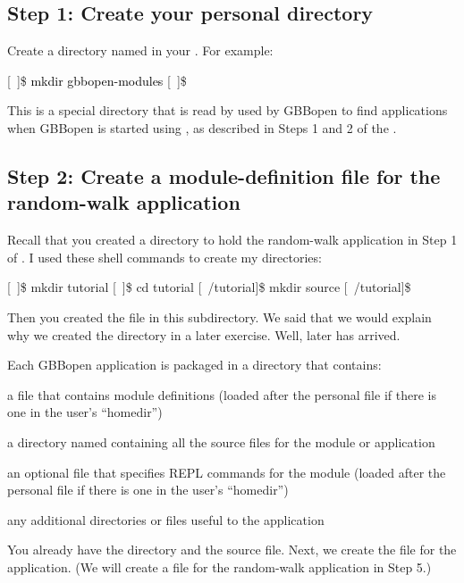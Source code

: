 \documentclass[10pt,twoside,english,pdftex]{article}
\begin{document}
\subsection*{Step 1: Create your personal  directory}

Create a directory named  in your
.  For example:
%
\W\supp
\begin{example}
\textcolor{darkergray}{%
  [~]\$ \textcolor{black}{mkdir gbbopen-modules}
  [~]\$}
\end{example}
%
This is a special directory that is read by used by GBBopen to find
applications when GBBopen is started using
, as described in Steps 1 and
2 of the .

\subsection*{Step 2: Create a module-definition file for the random-walk application}

Recall that you created a directory to hold the random-walk application in
Step 1 of .  I used these
shell commands to create my directories:
%
\W\supp
\begin{example}
\textcolor{darkergray}{%
  [~]\$ mkdir tutorial
  [~]\$ cd tutorial
  [~/tutorial]\$ mkdir source
  [~/tutorial]\$}
\end{example}
%
Then you created the  file in this
 subdirectory. We said that we would explain why we created the
 directory in a later exercise.  Well, later has arrived.

Each GBBopen application is packaged in a directory that contains:
\begin{tightitemize}
\item a  file that contains module definitions
  (loaded after the personal  file if there is
  one in the user's ``homedir'')
\item a directory named  containing all the source files for the
  module or application
\item an optional  file that specifies REPL
  commands for the module (loaded after the personal
   file if there is one in the user's
  ``homedir'')
\item any additional directories or files useful to the application
\end{tightitemize}
%
You already have the  directory and the
 source file.  Next, we create the
 file for the application.  (We will create a
 file for the random-walk application in Step 5.)
\end{document}
